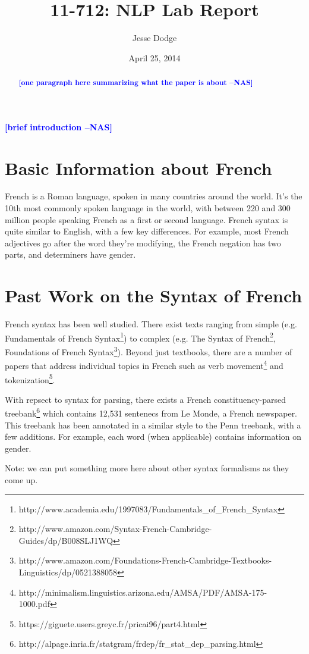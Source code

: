\documentclass[11pt,letterpaper]{article}
\title{11-712:  NLP Lab Report}
\author{Jesse Dodge}
\date{April 25, 2014}
\newcommand{\nascomment}[1]{\textcolor{blue}{\textbf{[#1 --NAS]}}}
\begin{document}
\maketitle
\begin{abstract}
\nascomment{one paragraph here summarizing what the paper is about}
\end{abstract}

\nascomment{brief introduction}

\section{Basic Information about French}
French is a Roman language, spoken in many countries around the world. It's the 10th most commonly spoken language in the world, with between 220 and 300 million people speaking French as a first or second language. French syntax is quite similar to English, with a few key differences. For example, most French adjectives go after the word they're modifying, the French negation has two parts, and determiners have gender. 

\section{Past Work on the Syntax of French}
French syntax has been well studied. There exist texts ranging from simple (e.g. Fundamentals of French Syntax\footnote{http://www.academia.edu/1997083/Fundamentals\_of\_French\_Syntax}) to complex (e.g. The Syntax of French\footnote{http://www.amazon.com/Syntax-French-Cambridge-Guides/dp/B008SLJ1WQ}, Foundations of French Syntax\footnote{http://www.amazon.com/Foundations-French-Cambridge-Textbooks-Linguistics/dp/0521388058}). Beyond just textbooks, there are a number of papers that address individual topics in French such as verb movement\footnote{http://minimalism.linguistics.arizona.edu/AMSA/PDF/AMSA-175-1000.pdf} and tokenization\footnote{https://giguete.users.greyc.fr/pricai96/part4.html}.

With repsect to syntax for parsing, there exists a French constituency-parsed treebank\footnote{http://alpage.inria.fr/statgram/frdep/fr_stat_dep_parsing.html} which contains 12,531 sentenecs from Le Monde, a French newspaper. This treebank has been annotated in a similar style to the Penn treebank, with a few additions. For example, each word (when applicable) contains information on gender. 

Note: we can put something more here about other syntax formalisms as they come up.
\end{document}
